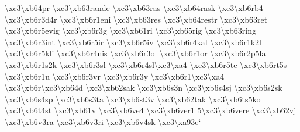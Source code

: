 \begin{DoxyCompactItemize}
\textbackslash{}xc3\textbackslash{}xb64pr \textbackslash{}xc3\textbackslash{}xb63rande \textbackslash{}xc3\textbackslash{}xb63ras \textbackslash{}xc3\textbackslash{}xb64rask \textbackslash{}xc3\textbackslash{}xb6rb4 \textbackslash{}xc3\textbackslash{}xb6r3d4r \textbackslash{}xc3\textbackslash{}xb6r1eni \textbackslash{}xc3\textbackslash{}xb63res \textbackslash{}xc3\textbackslash{}xb64restr \textbackslash{}xc3\textbackslash{}xb63ret \textbackslash{}xc3\textbackslash{}xb6r5evig \textbackslash{}xc3\textbackslash{}xb6r3g \textbackslash{}xc3\textbackslash{}xb61ri \textbackslash{}xc3\textbackslash{}xb65rig \textbackslash{}xc3\textbackslash{}xb63ring \textbackslash{}xc3\textbackslash{}xb6r3int \textbackslash{}xc3\textbackslash{}xb6r5ir \textbackslash{}xc3\textbackslash{}xb6r5iv \textbackslash{}xc3\textbackslash{}xb6r4kal \textbackslash{}xc3\textbackslash{}xb6r1k2l \textbackslash{}xc3\textbackslash{}xb6r5kli \textbackslash{}xc3\textbackslash{}xb6r4nis \textbackslash{}xc3\textbackslash{}xb6r3ol \textbackslash{}xc3\textbackslash{}xb6r1or \textbackslash{}xc3\textbackslash{}xb6r2p5la \textbackslash{}xc3\textbackslash{}xb6r1s2k \textbackslash{}xc3\textbackslash{}xb6r3sl \textbackslash{}xc3\textbackslash{}xb6r4sl\textbackslash{}xc3\textbackslash{}xa4 \textbackslash{}xc3\textbackslash{}xb6r5te \textbackslash{}xc3\textbackslash{}xb6rt5s \textbackslash{}xc3\textbackslash{}xb6r1u \textbackslash{}xc3\textbackslash{}xb6r3vr \textbackslash{}xc3\textbackslash{}xb6r3y \textbackslash{}xc3\textbackslash{}xb6r1\textbackslash{}xc3\textbackslash{}xa4 \textbackslash{}xc3\textbackslash{}xb6r\textbackslash{}xc3\textbackslash{}xb64d \textbackslash{}xc3\textbackslash{}xb62sak \textbackslash{}xc3\textbackslash{}xb6s3n \textbackslash{}xc3\textbackslash{}xb6s4sj \textbackslash{}xc3\textbackslash{}xb6s2sk \textbackslash{}xc3\textbackslash{}xb6s4sp \textbackslash{}xc3\textbackslash{}xb6s3ta \textbackslash{}xc3\textbackslash{}xb6st3v \textbackslash{}xc3\textbackslash{}xb62tak \textbackslash{}xc3\textbackslash{}xb6ts5ko \textbackslash{}xc3\textbackslash{}xb6t4st \textbackslash{}xc3\textbackslash{}xb61v \textbackslash{}xc3\textbackslash{}xb6ve4 \textbackslash{}xc3\textbackslash{}xb6ver1 5\textbackslash{}xc3\textbackslash{}xb6vere \textbackslash{}xc3\textbackslash{}xb62vj \textbackslash{}xc3\textbackslash{}xb6v3ra \textbackslash{}xc3\textbackslash{}xb6v3ri \textbackslash{}xc3\textbackslash{}xb6v4sk \textbackslash{}xc3\textbackslash{}xa93e\char`\"{}
\end{DoxyCompactItemize}


